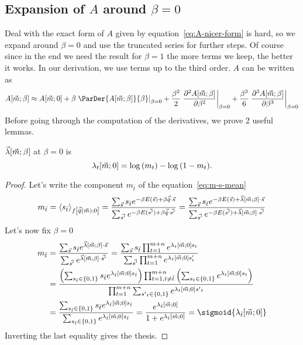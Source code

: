 \subsection{Expansion of \(A\) around \(\beta=0\)}
Deal with the exact form of \(A\) given by equation~\eqref{eq:A-nicer-form} is hard,
so we expand around \(\beta = 0\) and use the truncated series for further steps.
Of course since in the end we need the result for \(\beta=1\) the more terms we keep, the better
it works. In our derivation, we use terms up to the third order.
\(A\) can be written as
\[
  A{\left[\vec{m};\beta\right]} \approx
    A{\left[\vec{m};0\right]} + 
    \beta \left.\ParDer{A{\left[\vec{m};\beta\right]}}{\beta}\right|_{\beta=0} +
    \frac{\beta^2}{2}
      \left.\frac{\partial^2A{\left[\vec{m};\beta\right]}}{\partial\beta^2}\right|_{\beta=0}+
    \frac{\beta^3}{6} 
      \left.\frac{\partial^3A{\left[\vec{m};\beta\right]}}{\partial\beta^3}\right|_{\beta=0}    
\]
Before going through the computation of the derivatives, we prove 2 useful lemmas.
\begin{lemma} \label{lem:lambda-t-zero}
  \(\vec{\lambda}{\left[\vec{m};\beta\right]}\) at \(\beta = 0\) is
  \[
    \lambda_t{\left[\vec{m};0\right]} = \log{\left(m_t\right)} - \log{\left(1-m_t\right)}.
  \]
  \begin{proof}
    Let's write the component \(m_{\bar{t}}\) of the equation~\eqref{eq:m-s-mean}
    \[
      m_{\bar{t}} = \left\langle s_{\bar{t}}\right\rangle_{f{\left[\vec{\hat{q}}{(\vec{m})};0\right]}}
      = \frac{\sum_{\vec{s}} s_{\bar{t}} e^{-\beta E(\vec{s}) + \beta \vec{\hat{q}}\cdot\vec{s}}}
             {\sum_{\vec{s'}}e^{-\beta E(\vec{s'}) + \beta \vec{\hat{q}}\cdot\vec{s'}}}
      = \frac{\sum_{\vec{s}} s_{\bar{t}} e^{-\beta E(\vec{s}) + \vec{\lambda}{\left[\vec{m};\beta\right]}\cdot\vec{s}}}
             {\sum_{\vec{s'}}e^{-\beta E(\vec{s'}) + \vec{\lambda}{\left[\vec{m};\beta\right]}\cdot\vec{s'}}}
    \]
    Let's now fix \(\beta=0\)
    \begin{align*} \displaystyle
      m_{\bar{t}} &= \frac{\sums s_{\bar{t}} e^{\Lambd{\vec{m}}{\beta}\cdot\vec{s}}}
                          {\sum_{\vec{s'}}e^{\Lambd{\vec{m}}{\beta}\cdot\vec{s'}}} 
                   = \frac{\sums s_{\bar{t}} \prodt e^{\lgtmz s_t}}
                          {\sum_{\vec{s'}}\prodt e^{\lgtmz s'_t}} \\
                  &= \frac{\left(\sumstbar s_{\bar{t}}e^{\lgtbarmz s_{\bar{t}}}\right)
                           \prod_{t=1,t\neq{\bar{t}}}^{m+n}\left(\sumst e^{\lgtmz s_t}\right)}
                          {\prodt\sumstprim e^{\lgtmz {s'}_t}} \\
                  &= \frac{\sumstbar s_{\bar{t}}e^{\lgtbarmz s_{\bar{t}}}}
                          {\sumstbar e^{\lgtbarmz s_{\bar{t}}}}
                   = \frac{e^{\lgtbarmz}}{1+e^{\lgtbarmz}} = \sigmoid{\lgtbarmz}              
    \end{align*}
    Inverting the last equality gives the thesis.
  \end{proof}
\end{lemma}
